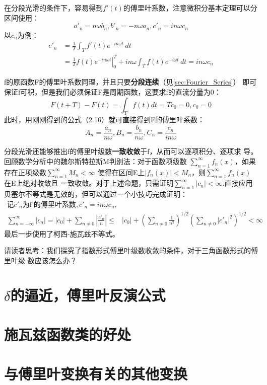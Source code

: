 \documentclass{ctexbook}
\begin{document}
在分段光滑的条件下，容易得到$f'(t)$的傅里叶系数，注意微积分基本定理可以分区间使用：
\begin{equation}
    a'_n=n\omega b_n,b'_n=-n\omega a_n,c'_n=in\omega c_n
\end{equation}
以$c_n$为例：
\begin{align*}
    c'_n & =\frac{1}{T}\int_{T}f'(t)e^{-in\omega t}\,dt                                                         \\
         & =\frac{1}{T}\left.f(t)e^{-in\omega t}\right|_0^T+in\omega\int_{T}f(t)e^{-i\omega t}\,dt=in\omega c_n
\end{align*}

f的原函数F的傅里叶系数同理，并且只要\textbf{分段连续}（见\ref{sec:Fourier_Series}）
即可保证f可积，但是我们必须保证F是周期函数，这要求f的直流分量为0：
\[F(t+T)-F(t)=\int_{T}f(t)dt=Tc_0=0,c_0=0\]
此时，用刚刚得到的公式（2.16）就可直接得到F的傅里叶系数：
\begin{equation}
    A_n=\frac{a_n}{n\omega},B_n=\frac{b_n}{n\omega},C_n=\frac{c_n}{in\omega}
\end{equation}

分段光滑还能够推出f的傅里叶级数\textbf{一致收敛}于f，从而可以逐项积分、逐项求
导。回顾数学分析中的魏尔斯特拉斯M判别法：对于函数项级数
$\sum_{n=1}^{\infty}f_n(x)$，如果存在正项级数$\sum_{n=1}^{\infty}M_n<\infty$
使得在区间E上$|f_n(x)|<M_n$，则$\sum_{n=1}^{\infty}f_n(x)$在E上绝对收敛且
一致收敛。对于上述命题，只需证明$\sum_{n=1}^{\infty}|c_n|<\infty$.直接应用
贝塞尔不等式是无效的，但可以通过一个小技巧完成证明：
\begin{align*}
    \text{记}c'_n\text{为f'的傅里叶系数},c'_n =in\omega c_n,                            &                                                                                \\
    \sum_{n=-\infty}^{\infty}|c_n|=   |c_0|+\sum_{n\neq 0}| \frac{c'_n}{n}|\leq & |c_0|+(\sum_{n\neq 0}\frac{1}{n^2})^{1/2}(\sum_{n\neq 0}|c'_n|^2)^{1/2}<\infty
\end{align*}
最后一步使用了柯西-施瓦兹不等式。

请读者思考：我们探究了指数形式傅里叶级数收敛的条件，对于三角函数形式的傅里叶级
数应该怎么办？

\section{$\delta$的逼近，傅里叶反演公式}\label{sec:delta}

\section{施瓦兹函数类的好处}\label{sec:Schwartz_Functions}

\section{与傅里叶变换有关的其他变换}\label{sec:Other_Transforms}
\end{document}
